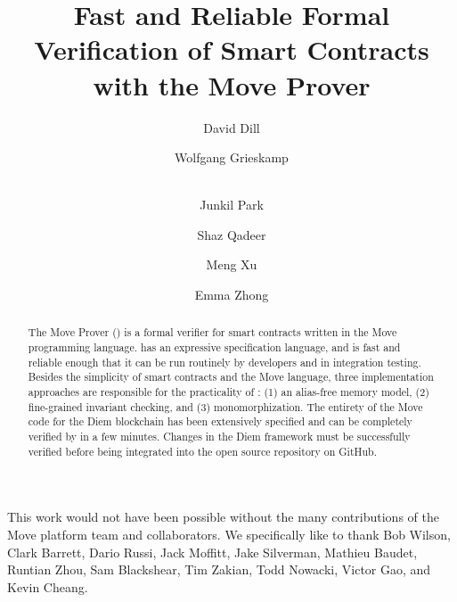 \documentclass[runningheads]{llncs}
\begin{document}
\author{
  David Dill \and Wolfgang Grieskamp \and \\ Junkil
  Park \and Shaz Qadeer \and Meng Xu
  \and Emma Zhong
}


\title{Fast and Reliable Formal Verification of Smart Contracts with the Move Prover}

\maketitle
\begin{abstract}
  The Move Prover (\MVP) is a formal verifier for smart contracts written in the
  Move programming language. \MVP has an expressive specification language, and
  is fast and reliable enough that it can be run routinely by developers and in
  integration testing.  Besides the simplicity of smart contracts and the Move
  language, three implementation approaches are responsible for the practicality
  of \MVP: (1) an alias-free memory model, (2) fine-grained invariant checking,
  and (3) monomorphization.  The entirety of the Move code for the Diem
  blockchain has been extensively specified and can be completely verified by
  \MVP in a few minutes. Changes in the Diem framework must be successfully
  verified before being integrated into the open source repository on GitHub.
\end{abstract}









This work would not have been possible without the many contributions of the
Move platform team and collaborators.  We specifically like to thank Bob Wilson,
Clark Barrett, Dario Russi, Jack Moffitt, Jake Silverman, Mathieu Baudet,
Runtian Zhou, Sam Blackshear, Tim Zakian, Todd Nowacki, Victor Gao, and Kevin
Cheang.

\newpage



\appendix
\newpage

\newpage

\end{document}
